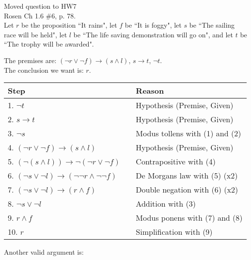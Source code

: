 \begin{questions}


 {\color{red} Moved question to HW7} \\
Rosen Ch 1.6 \#6, p. 78.\\
Let $r$ be the proposition ``It rains", let $f$ be ``It is foggy",
    let $s$ be ``The sailing race will be held", let $l$ be ``The life
    saving demonstration will go on", and let $t$ be ``The trophy will
    be awarded".
    \ifprintanswers
        \vspace{-10pt}
    \fi
\begin{solution}
    The premises are: $(\neg r \vee \neg f) \rightarrow (s \wedge l)$, $s \rightarrow t$, $\neg t$. \\
    The conclusion we want is: $r$.

    \begin{tabular}{lll}
        Step    & \hspace{0.2in} & Reason \\
        \hline
        1. $\neg t$                 &       & Hypothesis (Premise, Given) \\
        2. $s \rightarrow t$        &       & Hypothesis (Premise, Given) \\
        3. $\neg s$                 &       & Modus tollens with (1) and (2) \\
        4. $(\neg r \vee \neg f) \rightarrow (s \wedge l)$  &   & Hypothesis (Premise, Given)  \\
        5. $(\neg(s \wedge l)) \rightarrow \neg(\neg r \vee \neg f)$    & & Contrapositive with (4) \\
        6. $(\neg s \vee \neg l) \rightarrow (\neg \neg r \wedge \neg \neg f)$ & & De Morgans law with (5) (x2) \\
        7. $(\neg s \vee \neg l) \rightarrow (r \wedge f)$  & & Double negation with (6) (x2) \\
        8. $\neg s \vee \neg l$     &       & Addition with (3) \\
        9. $r \wedge f$             &       & Modus ponens with (7) and (8) \\
        10. $r$                     &       & Simplification with (9)
    \end{tabular}

    \medskip
    Another valid argument is:


\end{solution}
\end{questions}
